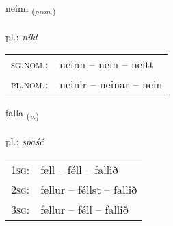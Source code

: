 \documentclass[frontgrid, backgrid]{flacards}\usepackage[]{graphicx}\usepackage[]{xcolor}
\begin{document}
\renewcommand{\flhead}{\vskip5pt \fboxsep=0pt {\small\bfseries\footnotesize Fornafn | Pronoun}}
\renewcommand{\fcfoot}{\vskip5pt \fboxsep=0pt \hspace{2pt}{\small\bfseries\footnotesize 1K}}

\renewcommand{\blhead}{\vskip5pt {\small\bfseries\footnotesize Fornafn | Pronoun }}
\renewcommand{\bcfoot}{\vskip5pt \hspace{2pt}{\small\bfseries\footnotesize 1K}}


{neinn \small{\textsubscript{(\textit{pron.})}} \\[1ex] %
\textphonetic{[neitn̥]} \\
pl.: \emph{nikt} \\  [2ex]
\renewcommand*{\arraystretch}{0.8}
\begin{tabular}{ll}
\textsc{sg.nom.}: & neinn  --  nein -- neitt \\ 
\textsc{pl.nom.}: & neinir -- neinar -- nein
\end{tabular}
}

\renewcommand{\flhead}{\vskip5pt \fboxsep=0pt {\small\bfseries\footnotesize Sagnorð | Verb}}
\renewcommand{\fcfoot}{\vskip5pt \fboxsep=0pt \hspace{2pt}{\small\bfseries\footnotesize 1K}}

\renewcommand{\blhead}{\vskip5pt {\small\bfseries\footnotesize Sagnorð | Verb }}
\renewcommand{\bcfoot}{\vskip5pt \hspace{2pt}{\small\bfseries\footnotesize 1K}}


{falla \small{\textsubscript{(\textit{v.})}} \\[1ex] %
\textphonetic{[fatla]} \\
pl.: \emph{spaść} \\  [2ex]
\renewcommand*{\arraystretch}{0.8}
\begin{tabular}{p{1cm}l}
\textsc{1sg}: & fell -- féll -- fallið \\ 
\textsc{2sg}: & fellur -- féllst -- fallið \\ 
\textsc{3sg}: & fellur -- féll -- fallið \\ 
\end{tabular}
}
\end{document}
